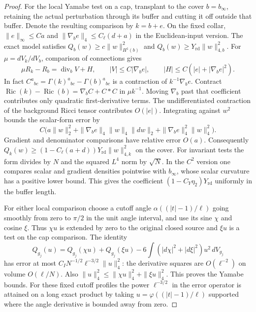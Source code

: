 \documentclass[11pt]{article}
\numberwithin{equation}{section}
\theoremstyle{definition}
\theoremstyle{remark}
\newcommand{\Ric}{\operatorname{Ric}}
\newcommand{\Yrd}{Y_{\mathrm{rd}}}
\begin{document}
\begin{proof}
For the local Yamabe test on a cap, transplant to the cover
\(b=b_\infty\), retaining the actual perturbation through
its buffer and cutting it off outside that buffer. Denote
the resulting comparison by \(k=b+e\). On the fixed collar,
\(\|e\|_\infty\le C a\) and
\(\|\nabla_b e\|_4\le C_\ell(d+a)\) in the Euclidean-input
version. The exact model satisfies
\(Q_b(w)\ge c\|w\|_{H^1(b)}^2\) and
\(Q_b(w)\ge\Yrd\|w\|_{4,b}^2\).
For \(\mu=dV_k/dV_b\), comparison of connections gives
\[
 \mu R_k-R_b=\operatorname{div}_b V+H,\qquad
 |V|\le C|\nabla_b e|,\qquad |H|\le C(|e|+|\nabla_b e|^2).
\]
In fact \(C^a{}_{bc}=\Gamma(k)^a{}_{bc}-\Gamma(b)^a{}_{bc}\)
is a contraction of \(k^{-1}\nabla_b e\).
Contract \(\Ric(k)-\Ric(b)=\nabla_b C+C*C\) in \(\mu k^{-1}\).
Moving \(\nabla_b\) past that coefficient contributes only
quadratic first-derivative terms. The undifferentiated
contraction of the background Ricci tensor contributes \(O(|e|)\).
Integrating against \(w^2\) bounds the scalar-form error by
\[
 C\big(a\|w\|_2^2+\|\nabla_b e\|_4\|w\|_4\|dw\|_2
                  +\|\nabla_b e\|_4^2\|w\|_4^2\big).
\]
Gradient and denominator comparisons have relative error \(O(a)\).
Consequently \(Q_k(w)\ge(1-C_\ell(a+d))\Yrd\|w\|_{4,k}^2\)
on the cover. For invariant tests the form divides by \(N\)
and the squared \(L^4\) norm by \(\sqrt N\).
In the \(C^2\) version one compares scalar and gradient
densities pointwise with \(b_\infty\), whose scalar curvature
has a positive lower bound. This gives the coefficient
\((1-C_Y\eta_2)\Yrd\) uniformly in the buffer length.

For either local comparison choose a cutoff angle
\(\alpha((|t|-1)/\ell)\) going smoothly from zero to \(\pi/2\)
in the unit angle interval, and use its sine \(\chi\) and
cosine \(\xi\). Thus \(\chi u\) is extended by zero to
the original closed source and \(\xi u\) is a test on the cap
comparison. The identity
\[
 Q_{g_j}(u)=Q_{g_j}(\chi u)+Q_{g_j}(\xi u)
 -6\int (|d\chi|^2+|d\xi|^2)u^2\,dV_{g_j}
\]
has error at most \(C_I N^{-1/2}\ell^{-3/2}\|u\|_4^2\):
the derivative squares are \(O(\ell^{-2})\) on volume
\(O(\ell/N)\). Also
\(\|u\|_4^2\le\|\chi u\|_4^2+\|\xi u\|_4^2\). This proves
the Yamabe bounds. For these fixed cutoff profiles the power
\(\ell^{-3/2}\) in the error operator is attained on a long exact
product by taking \(u=\varphi((|t|-1)/\ell)\) supported where the
angle derivative is bounded away from zero.
\end{proof}
\end{document}
